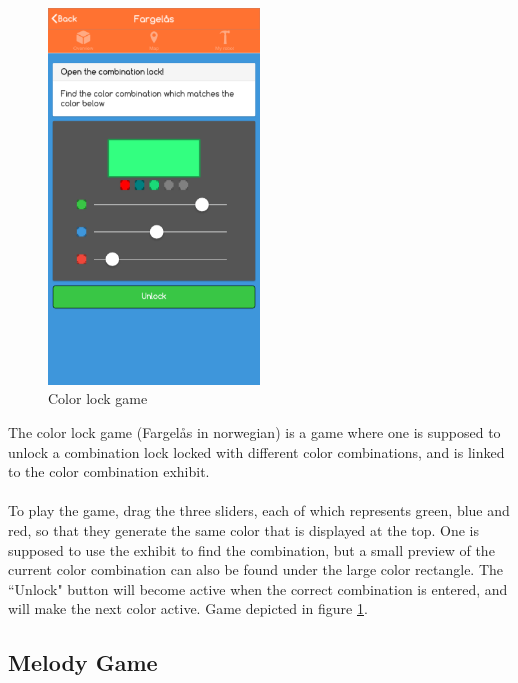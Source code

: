 \begin{figure}[H]
    \centering
    \includegraphics[width=0.5\textwidth]{images/app/colorlock.png}
    \caption{Color lock game}
    \label{fig:colorlock}
\end{figure}

The color lock game (Fargelås in norwegian) is a game where one is supposed to unlock a combination lock locked with different color combinations, and is linked to the color combination exhibit.\\\\
To play the game, drag the three sliders, each of which represents green, blue and red, so that they generate the same color that is displayed at the top. One is supposed to use the exhibit to find the combination, but a small preview of the current color combination can also be found under the large color rectangle. The ``Unlock" button will become active when the correct combination is entered, and will make the next color active. Game depicted in figure  \ref{fig:colorlock}.


\subsection{Melody Game}

